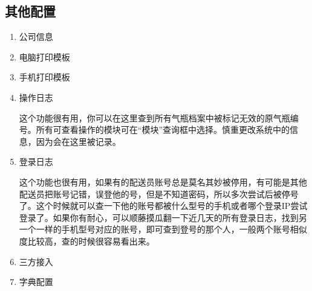 \documentclass[UTF8]{ctexart}
\begin{document}
\subsection{其他配置}

\begin{enumerate}
	\item 公司信息
	
	\item 电脑打印模板
	
	\item 手机打印模板
	
	\item 操作日志
	
	这个功能很有用，你可以在这里查到所有气瓶档案中被标记无效的原气瓶编号。所有可查看操作的模块可在“模块”查询框中选择。慎重更改系统中的信息，因为会在这里被记录。
	
	\item 登录日志
	
	这个功能也很有用，如果有的配送员账号总是莫名其妙被停用，有可能是其他配送员把账号记错，误登他的号，但是不知道密码，所以多次尝试后被停号了。这个时候就可以查一下他的账号都被什么型号的手机或者哪个登录IP尝试登录了。如果你有耐心，可以顺藤摸瓜翻一下近几天的所有登录日志，找到另一个一样的手机型号对应的账号，即可查到登号的那个人，一般两个账号相似度比较高，查的时候很容易看出来。
	
	\item 三方接入
	
	\item 字典配置
	
\end{enumerate}
\end{document}
